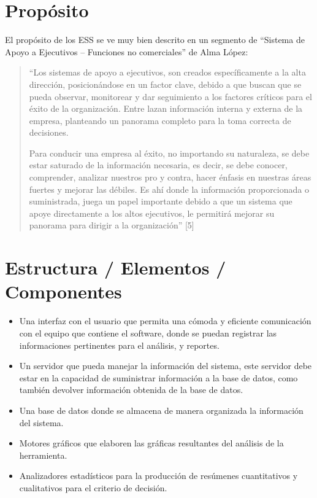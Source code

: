 \section {Propósito}
El propósito de los ESS se ve muy bien descrito en un segmento de “Sistema de Apoyo a Ejecutivos – Funciones no comerciales” de Alma López:

\begin{quote} 
“Los sistemas de apoyo a ejecutivos, son creados específicamente a la alta dirección, posicionándose en un factor clave, debido a que buscan que se pueda observar, monitorear y dar seguimiento a los factores críticos para el éxito de la organización. Entre lazan información interna y externa de la empresa, planteando un panorama completo para la toma correcta de decisiones.
  
Para conducir una empresa al éxito, no importando su naturaleza, se debe estar saturado de la información necesaria, es decir, se debe conocer, comprender, analizar nuestros pro y contra, hacer énfasis en nuestras áreas fuertes y mejorar las débiles. Es ahí donde la información proporcionada o suministrada, juega un papel importante debido a que un sistema que apoye directamente a los altos ejecutivos, le permitirá mejorar su panorama para dirigir a la organización” [5] 
\end{quote}

\section {Estructura / Elementos / Componentes}
\begin{itemize}
\item Una interfaz con el usuario que permita una cómoda y eficiente comunicación con el equipo que contiene el software, donde se puedan registrar las informaciones pertinentes para el análisis, y reportes.
\item Un servidor que pueda manejar la información del sistema, este servidor debe estar en la capacidad de suministrar información a la base de datos, como también devolver información obtenida de la base de datos.
\item Una base de datos donde se almacena  de manera organizada la información del sistema.
\item Motores gráficos que elaboren las gráficas resultantes del análisis de la herramienta.
\item Analizadores estadísticos para la producción de resúmenes cuantitativos y cualitativos para el criterio de decisión.
\end{itemize}

